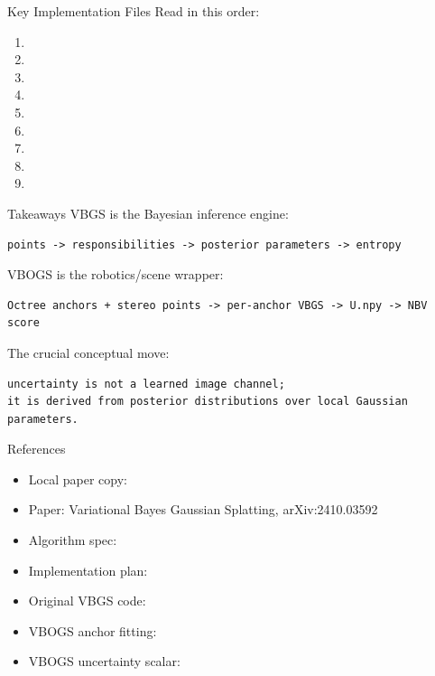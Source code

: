 \documentclass[aspectratio=169]{beamer}
\begin{document}
\begin{frame}{Key Implementation Files}
  Read in this order:

  \begin{enumerate}
    \item {}
    \item {}
    \item {}
    \item {}
    \item {}
    \item {}
    \item {}
    \item {}
    \item {}
  \end{enumerate}
\end{frame}

\begin{frame}[fragile]{Takeaways}
  VBGS is the Bayesian inference engine:

\begin{verbatim}
points -> responsibilities -> posterior parameters -> entropy
\end{verbatim}

  VBOGS is the robotics/scene wrapper:

\begin{verbatim}
Octree anchors + stereo points -> per-anchor VBGS -> U.npy -> NBV score
\end{verbatim}

  The crucial conceptual move:

\begin{verbatim}
uncertainty is not a learned image channel;
it is derived from posterior distributions over local Gaussian parameters.
\end{verbatim}
\end{frame}

\begin{frame}{References}
  \begin{itemize}
    \item Local paper copy: 
    \item Paper: Variational Bayes Gaussian Splatting, arXiv:2410.03592
    \item Algorithm spec: 
    \item Implementation plan: 
    \item Original VBGS code: 
    \item VBOGS anchor fitting: 
    \item VBOGS uncertainty scalar: 
  \end{itemize}
\end{frame}
\end{document}

